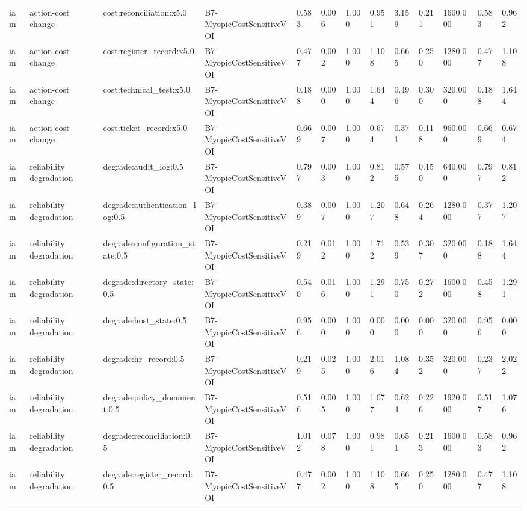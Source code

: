 \begin{table}[!ht]
{\begin{tabular}{lllllllllllll}
iam & action-cost change & cost:reconciliation:x5.0 & B7-MyopicCostSensitiveVOI & 0.583 & 0.006 & 1.000 & 0.951 & 3.159 & 0.211 & 1600.000 & 0.583 & 0.962 \\
iam & action-cost change & cost:register\_record:x5.0 & B7-MyopicCostSensitiveVOI & 0.477 & 0.002 & 1.000 & 1.108 & 0.665 & 0.250 & 1280.000 & 0.477 & 1.108 \\
iam & action-cost change & cost:technical\_test:x5.0 & B7-MyopicCostSensitiveVOI & 0.188 & 0.000 & 1.000 & 1.644 & 0.496 & 0.300 & 320.000 & 0.188 & 1.644 \\
iam & action-cost change & cost:ticket\_record:x5.0 & B7-MyopicCostSensitiveVOI & 0.669 & 0.007 & 1.000 & 0.674 & 0.371 & 0.118 & 960.000 & 0.669 & 0.674 \\
iam & reliability degradation & degrade:audit\_log:0.5 & B7-MyopicCostSensitiveVOI & 0.797 & 0.003 & 1.000 & 0.812 & 0.575 & 0.150 & 640.000 & 0.797 & 0.812 \\
iam & reliability degradation & degrade:authentication\_log:0.5 & B7-MyopicCostSensitiveVOI & 0.389 & 0.007 & 1.000 & 1.207 & 0.648 & 0.264 & 1280.000 & 0.377 & 1.207 \\
iam & reliability degradation & degrade:configuration\_state:0.5 & B7-MyopicCostSensitiveVOI & 0.219 & 0.012 & 1.000 & 1.712 & 0.539 & 0.307 & 320.000 & 0.188 & 1.644 \\
iam & reliability degradation & degrade:directory\_state:0.5 & B7-MyopicCostSensitiveVOI & 0.540 & 0.016 & 1.000 & 1.291 & 0.750 & 0.272 & 1600.000 & 0.458 & 1.291 \\
iam & reliability degradation & degrade:host\_state:0.5 & B7-MyopicCostSensitiveVOI & 0.956 & 0.000 & 1.000 & 0.000 & 0.000 & 0.000 & 320.000 & 0.956 & 0.000 \\
iam & reliability degradation & degrade:hr\_record:0.5 & B7-MyopicCostSensitiveVOI & 0.219 & 0.025 & 1.000 & 2.016 & 1.084 & 0.352 & 320.000 & 0.237 & 2.022 \\
iam & reliability degradation & degrade:policy\_document:0.5 & B7-MyopicCostSensitiveVOI & 0.516 & 0.005 & 1.000 & 1.077 & 0.624 & 0.226 & 1920.000 & 0.517 & 1.076 \\
iam & reliability degradation & degrade:reconciliation:0.5 & B7-MyopicCostSensitiveVOI & 1.012 & 0.078 & 1.000 & 0.981 & 0.651 & 0.213 & 1600.000 & 0.583 & 0.962 \\
iam & reliability degradation & degrade:register\_record:0.5 & B7-MyopicCostSensitiveVOI & 0.477 & 0.002 & 1.000 & 1.108 & 0.665 & 0.250 & 1280.000 & 0.477 & 1.108 \\

\end{tabular}}
\end{table}
